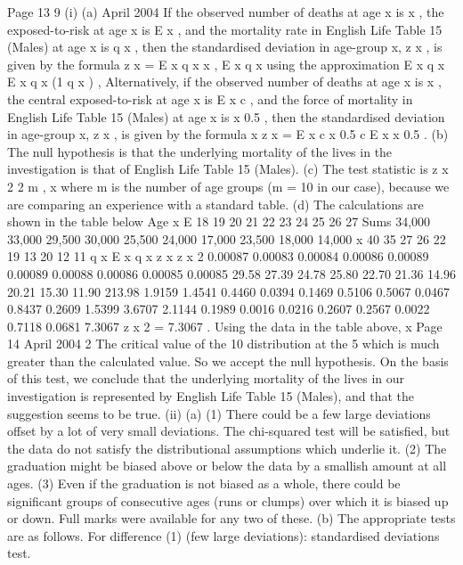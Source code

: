 \documentclass[a4paper,12pt]{article}
\begin{document}
Page 13 %
9
(i)
(a)
April 2004
If the observed number of deaths at age x is x , the exposed-to-risk at
age x is E x , and the mortality rate in English Life Table 15 (Males) at
age x is q x , then the standardised deviation in age-group x, z x , is given
by the formula
z x =
E x q x
x
,
E x q x
using the approximation E x q x
E x q x (1 q x ) ,
Alternatively, if the observed number of deaths at age x is
x ,
the
central exposed-to-risk at age x is E x c , and the force of mortality in
English Life Table 15 (Males) at age x is x 0.5 , then the standardised
deviation in age-group x, z x , is given by the formula
x
z x =
E x c
x 0.5
c
E x x 0.5
.
(b) The null hypothesis is that the underlying mortality of the lives in the
investigation is that of English Life Table 15 (Males).
(c) The test statistic is
z x 2
2
m ,
x
where m is the number of age groups (m = 10 in our case), because we
are comparing an experience with a standard table.
(d)
The calculations are shown in the table below
Age x E
18
19
20
21
22
23
24
25
26
27
Sums 34,000
33,000
29,500
30,000
25,500
24,000
17,000
23,500
18,000
14,000
x
40
35
27
26
22
19
13
20
12
11
q x E x q x z x z x 2
0.00087
0.00083
0.00084
0.00086
0.00089
0.00089
0.00088
0.00086
0.00085
0.00085 29.58
27.39
24.78
25.80
22.70
21.36
14.96
20.21
15.30
11.90
213.98 1.9159
1.4541
0.4460
0.0394
0.1469
0.5106
0.5067
0.0467
0.8437
0.2609
1.5399 3.6707
2.1144
0.1989
0.0016
0.0216
0.2607
0.2567
0.0022
0.7118
0.0681
7.3067
z x 2 = 7.3067 .
Using the data in the table above,
x
Page 14 %
April 2004
2
The critical value of the 10
distribution at the 5%
which is much greater than the calculated value.
So we accept the null hypothesis.
On the basis of this test, we conclude that the underlying mortality of
the lives in our investigation is represented by English Life Table 15
(Males), and that the suggestion seems to be true.
(ii)
(a)
(1) There could be a few large deviations offset by a lot of very small
deviations. The chi-squared test will be satisfied, but the data do
not satisfy the distributional assumptions which underlie it.
(2) The graduation might be biased above or below the data by a
smallish amount at all ages.
(3) Even if the graduation is not biased as a whole, there could be
significant groups of consecutive ages (runs or clumps) over
which it is biased up or down.
Full marks were available for any two of these.
(b)
The appropriate tests are as follows.
For difference (1) (few large deviations): standardised deviations test.
\end{document}
